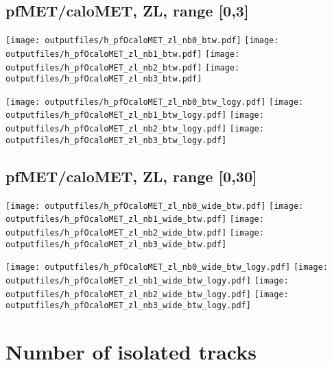 \documentclass[11pt]{article}
\begin{document}

    \subsection{ pfMET/caloMET, ZL, range [0,3]}

    \noindent
     \texttt{[image: outputfiles/h\_pfOcaloMET\_zl\_nb0\_btw.pdf]}
     \texttt{[image: outputfiles/h\_pfOcaloMET\_zl\_nb1\_btw.pdf]}
     \texttt{[image: outputfiles/h\_pfOcaloMET\_zl\_nb2\_btw.pdf]}
     \texttt{[image: outputfiles/h\_pfOcaloMET\_zl\_nb3\_btw.pdf]}

    \noindent
     \texttt{[image: outputfiles/h\_pfOcaloMET\_zl\_nb0\_btw\_logy.pdf]}
     \texttt{[image: outputfiles/h\_pfOcaloMET\_zl\_nb1\_btw\_logy.pdf]}
     \texttt{[image: outputfiles/h\_pfOcaloMET\_zl\_nb2\_btw\_logy.pdf]}
     \texttt{[image: outputfiles/h\_pfOcaloMET\_zl\_nb3\_btw\_logy.pdf]}

    \clearpage



    \subsection{ pfMET/caloMET, ZL, range [0,30]}

    \noindent
     \texttt{[image: outputfiles/h\_pfOcaloMET\_zl\_nb0\_wide\_btw.pdf]}
     \texttt{[image: outputfiles/h\_pfOcaloMET\_zl\_nb1\_wide\_btw.pdf]}
     \texttt{[image: outputfiles/h\_pfOcaloMET\_zl\_nb2\_wide\_btw.pdf]}
     \texttt{[image: outputfiles/h\_pfOcaloMET\_zl\_nb3\_wide\_btw.pdf]}

    \noindent
     \texttt{[image: outputfiles/h\_pfOcaloMET\_zl\_nb0\_wide\_btw\_logy.pdf]}
     \texttt{[image: outputfiles/h\_pfOcaloMET\_zl\_nb1\_wide\_btw\_logy.pdf]}
     \texttt{[image: outputfiles/h\_pfOcaloMET\_zl\_nb2\_wide\_btw\_logy.pdf]}
     \texttt{[image: outputfiles/h\_pfOcaloMET\_zl\_nb3\_wide\_btw\_logy.pdf]}

    \clearpage


  \section{ Number of isolated tracks }
\end{document}
